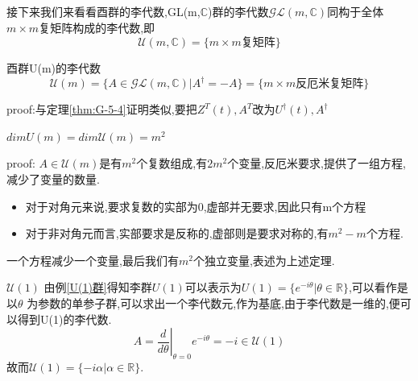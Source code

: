 \documentclass[../main.tex]{subfiles}
\begin{document}
 接下来我们来看看酉群的李代数,GL(m,$\mathbb{C}$)群的李代数$\mathscr{GL}(m,\mathbb{C})$同构于全体$m\times m$复矩阵构成的李代数,即
 $$\mathscr{U}(m,\mathbb{C}) = \{m\times m \text{复矩阵}\}$$
 \begin{theorem}
     酉群U(m)的李代数
     $$\mathscr{U}(m) = \{A \in \mathscr{GL}(m,\mathbb{C})|A^\dagger = -A\} = \{m\times m \text{反厄米复矩阵}\}$$
 \end{theorem}
 proof:与定理\ref{thm:G-5-4}证明类似,要把$Z^T(t),A^T$改为$U^\dagger(t),A^\dagger$
 \begin{theorem}{}{}
    \centering $dimU(m)=dim\mathscr{U}(m)=m^2$
 \end{theorem}
 proof: $A\in \mathscr{U}(m)$是有$m^2$个复数组成,有$2m^2$个变量,反厄米要求,提供了一组方程,减少了变量的数量.
 \begin{itemize}
     \item 对于对角元来说,要求复数的实部为0,虚部并无要求,因此只有m个方程
     \item 对于非对角元而言,实部要求是反称的,虚部则是要求对称的,有$m^2 - m$个方程.
 \end{itemize}
 一个方程减少一个变量,最后我们有$m^2$个独立变量,表述为上述定理.
 \begin{example}{$\mathscr{U}(1)$}{}
    由例\ref{U(1)群}得知李群$U(1)$可以表示为$U(1) = \{e^{-i\theta}|\theta \in \mathbb{R}\}$,可以看作是以$\theta$
    为参数的单参子群,可以求出一个李代数元,作为基底,由于李代数是一维的,便可以得到U(1)的李代数.
    $$A = \left.\frac{d}{d\theta}\right|_{\theta = 0} e^{-i \theta} = -i \in \mathscr{U}(1)$$
    故而$\mathscr{U}(1) = \{-i\alpha|\alpha \in \mathbb{R}\}$.
 \end{example}
\end{document}

